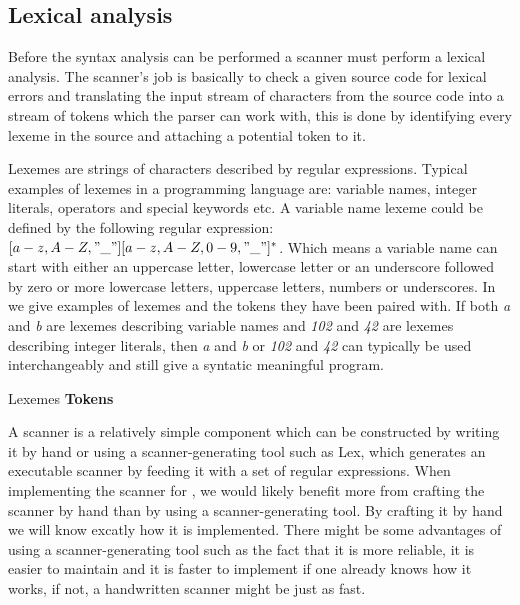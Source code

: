 \subsection{Lexical analysis}
\label{sec:lexicalanalysis}
Before the syntax analysis can be performed a scanner must perform a lexical
analysis. The scanner's job is basically to check a given source code for lexical
errors and translating the input stream of characters from the source code into
a stream of tokens which the parser can work with, this
is done by identifying every lexeme in the source and attaching a potential
token to it.
\cite[p. 57]{fischer2009}

Lexemes are strings of characters described by regular expressions.  Typical
examples of lexemes in a programming language are: variable names, integer
literals, operators and special keywords etc. A variable name lexeme could be
defined by the following regular expression: $[a-z, A-Z, "\_"][a-z, A-Z, 0-9,
"\_"]^*$. Which means a variable name can start with either an uppercase letter,
lowercase letter or an underscore followed by zero or more lowercase letters,
uppercase letters, numbers or underscores. In  we
give examples of lexemes and the tokens they have been paired with. If both
\textit{a} and \textit{b} are lexemes describing variable names and \textit{102}
and \textit{42} are lexemes describing integer literals, then \textit{a} and
\textit{b} or \textit{102} and \textit{42} can typically be used interchangeably
and still give a syntatic meaningful program.

		             {               }
       {Lexemes             }{\textbf{Tokens} } {
}

A scanner is a relatively simple component which can be constructed by writing
it by hand or using a scanner-generating tool such as Lex, which generates an
executable scanner by feeding it with a set of regular expressions. When
implementing the scanner for \productname{}, we would likely benefit more from
crafting the scanner by hand than by using a scanner-generating tool. By
crafting it by hand we will know excatly how it is implemented. There might be
some advantages of using a scanner-generating tool such as the fact that it is
more reliable, it is easier to maintain and it is faster to implement if one
already knows how it works, if not, a handwritten scanner might be just as fast. 
